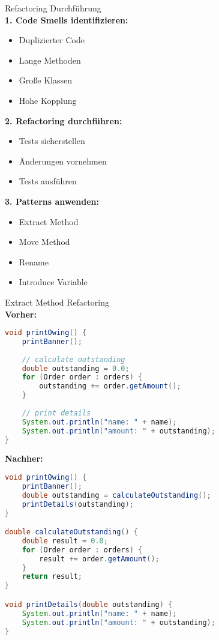 \begin{KR}{Refactoring Durchführung}\\
\textbf{1. Code Smells identifizieren:}
\begin{itemize}
    \item Duplizierter Code
    \item Lange Methoden
    \item Große Klassen
    \item Hohe Kopplung
\end{itemize}

\textbf{2. Refactoring durchführen:}
\begin{itemize}
    \item Tests sicherstellen
    \item Änderungen vornehmen
    \item Tests ausführen
\end{itemize}

\textbf{3. Patterns anwenden:}
\begin{itemize}
    \item Extract Method
    \item Move Method
    \item Rename
    \item Introduce Variable
\end{itemize}
\end{KR}

\begin{example}{Extract Method Refactoring}\\
\textbf{Vorher:}
\begin{lstlisting}[language=Java, style=base]
void printOwing() {
    printBanner();
    
    // calculate outstanding
    double outstanding = 0.0;
    for (Order order : orders) {
        outstanding += order.getAmount();
    }
    
    // print details
    System.out.println("name: " + name);
    System.out.println("amount: " + outstanding);
}
\end{lstlisting}

\textbf{Nachher:}
\begin{lstlisting}[language=Java, style=base]
void printOwing() {
    printBanner();
    double outstanding = calculateOutstanding();
    printDetails(outstanding);
}

double calculateOutstanding() {
    double result = 0.0;
    for (Order order : orders) {
        result += order.getAmount();
    }
    return result;
}

void printDetails(double outstanding) {
    System.out.println("name: " + name);
    System.out.println("amount: " + outstanding);
}
\end{lstlisting}
\end{example}


